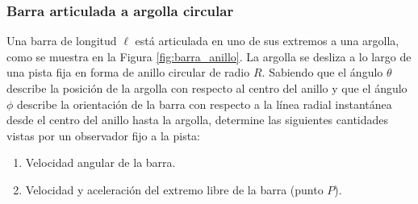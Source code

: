 \subsubsection{Barra articulada a argolla circular}

Una barra de longitud $\ell$ está articulada en uno de sus extremos a una argolla, como se muestra en la Figura \ref{fig:barra_anillo}. La argolla se desliza a lo largo de una pista fija en forma de anillo circular de radio $R$. Sabiendo que el ángulo $\theta$ describe la posición de la argolla con respecto al centro del anillo y que el ángulo $\phi$ describe la orientación de la barra con respecto a la línea radial instantánea desde el centro del anillo hasta la argolla, determine las siguientes cantidades vistas por un observador fijo a la pista:

\begin{enumerate}
    \item Velocidad angular de la barra.
    \item Velocidad y aceleración del extremo libre de la barra (punto $P$).
\end{enumerate}

